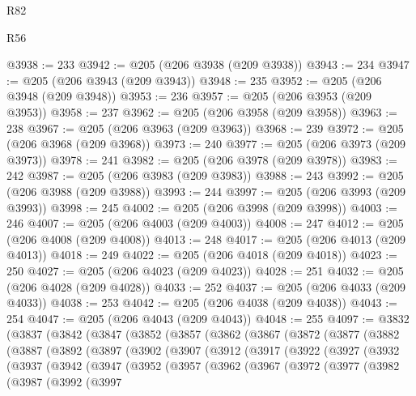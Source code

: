 \begin{lexlean}{R82}
\begin{lexlean}{R56}
\begin{coremodule}
{{{{{{{{{{{{{{{{{{{{{{{{{{{{{{{{{{{{{{{{{{{{{{{{{{{{{{{{{{{{{{{{{{{{{{{{{{{{{{{{{{{{{{{{{{{{{{{{{{{{{{{{{{{{{{{{{{{{{{{{{{{{{{{{{{{{{{{{{{{{{{{{{{{{{{{{{{{{{{{{{{{{{{{{{{{{{{{{{{{{{{{{{{{{{{{{{{{{{{{{{{{{{{{{{{{@3938 := 233
@3942 := @205 (@206 @3938 (@209 @3938))
@3943 := 234
@3947 := @205 (@206 @3943 (@209 @3943))
@3948 := 235
@3952 := @205 (@206 @3948 (@209 @3948))
@3953 := 236
@3957 := @205 (@206 @3953 (@209 @3953))
@3958 := 237
@3962 := @205 (@206 @3958 (@209 @3958))
@3963 := 238
@3967 := @205 (@206 @3963 (@209 @3963))
@3968 := 239
@3972 := @205 (@206 @3968 (@209 @3968))
@3973 := 240
@3977 := @205 (@206 @3973 (@209 @3973))
@3978 := 241
@3982 := @205 (@206 @3978 (@209 @3978))
@3983 := 242
@3987 := @205 (@206 @3983 (@209 @3983))
@3988 := 243
@3992 := @205 (@206 @3988 (@209 @3988))
@3993 := 244
@3997 := @205 (@206 @3993 (@209 @3993))
@3998 := 245
@4002 := @205 (@206 @3998 (@209 @3998))
@4003 := 246
@4007 := @205 (@206 @4003 (@209 @4003))
@4008 := 247
@4012 := @205 (@206 @4008 (@209 @4008))
@4013 := 248
@4017 := @205 (@206 @4013 (@209 @4013))
@4018 := 249
@4022 := @205 (@206 @4018 (@209 @4018))
@4023 := 250
@4027 := @205 (@206 @4023 (@209 @4023))
@4028 := 251
@4032 := @205 (@206 @4028 (@209 @4028))
@4033 := 252
@4037 := @205 (@206 @4033 (@209 @4033))
@4038 := 253
@4042 := @205 (@206 @4038 (@209 @4038))
@4043 := 254
@4047 := @205 (@206 @4043 (@209 @4043))
@4048 := 255
@4097 := @3832
    (@3837
      (@3842
        (@3847
          (@3852
            (@3857
              (@3862
                (@3867
                  (@3872
                    (@3877
                      (@3882
                        (@3887
                          (@3892
                            (@3897
                              (@3902
                                (@3907
                                  (@3912
                                    (@3917
                                      (@3922
                                        (@3927
                                          (@3932
                                            (@3937
                                              (@3942
                                                (@3947
                                                  (@3952
                                                    (@3957
                                                      (@3962
                                                        (@3967
                                                          (@3972
                                                            (@3977
                                                              (@3982
                                                                (@3987
                                                                  (@3992
                                                                    (@3997
}}}}}}}}}}}}}}}}}}}}}}}}}}}}}}}}}}}}}}}}}}}}}}}}}}}}}}}}}}}}}}}}}}}}}}}}}}}}}}}}}}}}}}}}}}}}}}}}}}}}}}}}}}}}}}}}}}}}}}}}}}}}}}}}}}}}}}}}}}}}}}}}}}}}}}}}}}}}}}}}}}}}}}}}}}}}}}}}}}}}}}}}}}}}}}}}}}}}}}}}}}}}}}}}}}}
\end{coremodule}
\end{lexlean}
\end{lexlean}
